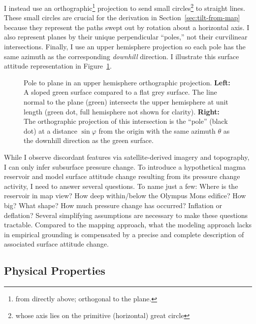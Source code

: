 I instead use an orthographic\footnote{from directly above; orthogonal to the plane.} projection to send small circles\footnote{whose axis lies on the primitive (horizontal) great circle} to straight lines. These small circles are crucial for the derivation in Section~\ref{sec:tilt-from-map} because they represent the paths swept out by rotation about a horizontal axis. I also represent planes by their unique perpendicular ``poles,'' not their curvilinear intersections. Finally, I use an upper hemisphere projection so each pole has the same azimuth as the corresponding \emph{downhill} direction. I illustrate this surface attitude representation in Figure~\ref{fig:surface}.

\begin{figure}
    \caption[Orthographic pole to plane]{Pole to plane in an upper hemisphere orthographic projection. \textbf{Left:} A sloped green surface compared to a flat grey surface. The line normal to the plane (green) intersects the upper hemisphere at unit length (green dot, full hemisphere not shown for clarity). \textbf{Right:} The orthographic projection of this intersection is the ``pole'' (black dot) at a distance $\sin\varphi$ from the origin with the same azimuth $\theta$ as the downhill direction as the green surface.}%
    \label{fig:surface}%
\end{figure}


While I observe discordant features via satellite-derived imagery and topography, I can only infer subsurface pressure change. To introduce a hypothetical magma reservoir and model surface attitude change resulting from its pressure change activity, I need to answer several questions. To name just a few: Where is the reservoir in map view? How deep within/below the Olympus Mons edifice? How big? What shape? How much pressure change has occurred? Inflation or deflation? Several simplifying assumptions are necessary to make these questions tractable. Compared to the mapping approach, what the modeling approach lacks in empirical grounding is compensated by a precise and complete description of associated surface attitude change.

\subsection{Physical Properties}

